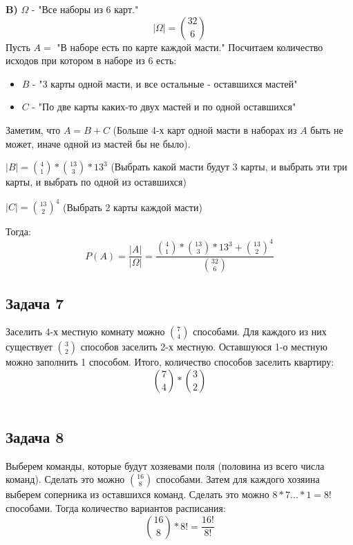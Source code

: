 \documentclass{article}
\begin{document}
\textbf{B)} $ \Omega $ - "Все наборы из 6 карт."
$$ |\Omega| = {32 \choose 6} $$
Пусть $A = $ "В наборе есть по карте каждой масти."
Посчитаем количество исходов при котором в наборе из 6 есть:
\\
 \begin{itemize} 
\item{$B$ - "3 карты одной масти, и все остальные - оставшихся мастей"}
\item{$C$ - "По две карты каких-то двух мастей и по одной оставшихся"}
\end{itemize} 
Заметим, что $ A = B + C $ (Больше 4-х карт одной масти в наборах из $A$ быть не может, иначе одной из мастей бы не было).
\\
\begin{flushleft}
	$|B| = {4 \choose 1} * {13 \choose 3} * 13^3$ (Выбрать какой масти будут 3 карты, и выбрать эти три карты, и выбрать по одной из оставшихся) 
\end{flushleft}
\begin{center}
	$|C| = {13 \choose 2}^4 $ (Выбрать 2 карты каждой масти)
\end{center}
Тогда:
$$ P(A) = \frac{|A|}{|\Omega|} = \frac{{4 \choose 1} * {13 \choose 3} * 13^3 +  {13 \choose 2}^4}{{32 \choose 6}}$$   

\begin{center}
	\subsection*{Задача 7}
\end{center} 

Заселить 4-х местную комнату можно $ {7 \choose 4} $ способами. Для каждого из них существует  $ {3 \choose 2} $ способов заселить 2-х местную.
Оставшуюся 1-о местную можно заполнить 1 способом.
Итого, количество способов заселить квартиру:
$$ {7 \choose 4} *  {3 \choose 2} $$
\\
\begin{center}
	\subsection*{Задача 8}
\end{center}

Выберем команды, которые будут хозяевами поля (половина из всего числа команд). Сделать это можно $ {16 \choose 8} $ способами. Затем для каждого хозяина выберем соперника из оставшихся команд. Сделать это можно $ 8 * 7 ... * 1 = 8! $ способами.
Тогда количество вариантов расписания:
$$ {16 \choose 8} * 8! = \frac{16!}{8!}$$ 
\end{document}
